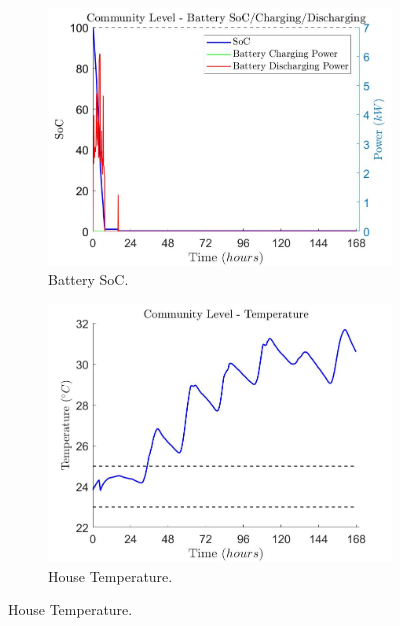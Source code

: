 \documentclass[11pt,usenames]{article}
\begin{document}
\begin{figure}[!t]
	\centering
	\begin{subfigure}[t]{0.48\textwidth}
		\centering
		\includegraphics[scale=0.3]{Gainesville_BaseLine_7DayTest_SC_PVBat1_Bat1_PV1_None1_SCL2_Community_Bat_SoC_C_DisC.JPG}
		\caption{Battery SoC.}
		\label{fig:Bat_1}
	\end{subfigure}
	\begin{subfigure}[t]{0.48\textwidth}
		\centering
		\includegraphics[scale=0.3]{Gainesville_BaseLine_7DayTest_SC_PVBat1_Bat1_PV1_None1_SCL2_Community_Temperature.JPG}
		\caption{House Temperature.}
		\label{fig:Temp_1}
	\end{subfigure}
	

\end{figure}
\end{document}
